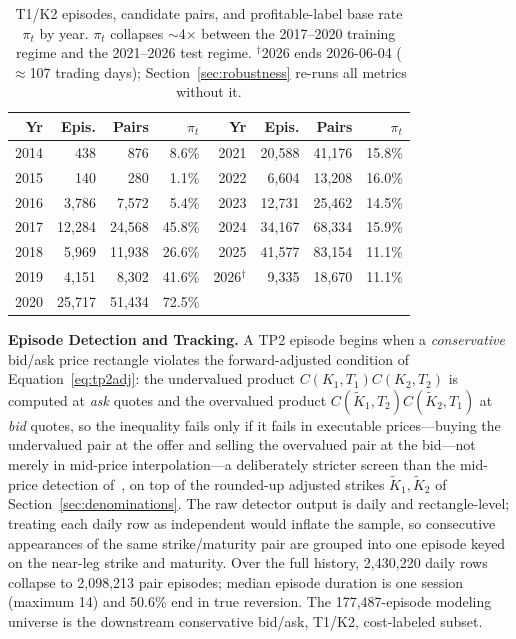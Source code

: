 \documentclass[sigconf,review,anonymous]{acmart}
\begin{document}
\begin{table}[t]
\centering
\footnotesize
\begin{tabular}{rrrr@{\hskip 1.4em}rrrr}
\toprule
Yr & Epis. & Pairs & $\pi_t$ & Yr & Epis. & Pairs & $\pi_t$ \\
\midrule
2014 & 438 & 876 & 8.6\% & 2021 & 20{,}588 & 41{,}176 & 15.8\% \\
2015 & 140 & 280 & 1.1\% & 2022 & 6{,}604 & 13{,}208 & 16.0\% \\
2016 & 3{,}786 & 7{,}572 & 5.4\% & 2023 & 12{,}731 & 25{,}462 & 14.5\% \\
2017 & 12{,}284 & 24{,}568 & 45.8\% & 2024 & 34{,}167 & 68{,}334 & 15.9\% \\
2018 & 5{,}969 & 11{,}938 & 26.6\% & 2025 & 41{,}577 & 83{,}154 & 11.1\% \\
2019 & 4{,}151 & 8{,}302 & 41.6\% & 2026$^\dagger$ & 9{,}335 & 18{,}670 & 11.1\% \\
2020 & 25{,}717 & 51{,}434 & 72.5\% & & & & \\
\bottomrule
\end{tabular}
\caption{T1/K2 episodes, candidate pairs, and profitable-label base rate $\pi_t$ by year. $\pi_t$ collapses $\sim$4$\times$ between the 2017--2020 training regime and the 2021--2026 test regime. $^\dagger$2026 ends 2026-06-04 ($\approx$107 trading days); Section~\ref{sec:robustness} re-runs all metrics without it.}
\label{tab:peryear}
\end{table}

\medskip\noindent\textbf{Episode Detection and Tracking.}
\label{sec:episode-tracking}
A TP2 episode begins when a \emph{conservative} bid/ask price rectangle violates the forward-adjusted condition of Equation~\eqref{eq:tp2adj}: the undervalued product $C(K_1,T_1)C(K_2,T_2)$ is computed at \emph{ask} quotes and the overvalued product $C(\tilde K_1,T_2)C(\tilde K_2,T_1)$ at \emph{bid} quotes, so the inequality fails only if it fails in executable prices---buying the undervalued pair at the offer and selling the overvalued pair at the bid---not merely in mid-price interpolation---a deliberately stricter screen than the mid-price detection of~\cite{glasserman2025tp2}, on top of the rounded-up adjusted strikes $\tilde K_1,\tilde K_2$ of Section~\ref{sec:denominations}. The raw detector output is daily and rectangle-level; treating each daily row as independent would inflate the sample, so consecutive appearances of the same strike/maturity pair are grouped into one episode keyed on the near-leg strike and maturity. Over the full history, 2{,}430{,}220 daily rows collapse to 2{,}098{,}213 pair episodes; median episode duration is one session (maximum 14) and 50.6\% end in true reversion. The 177{,}487-episode modeling universe is the downstream conservative bid/ask, T1/K2, cost-labeled subset.
\end{document}
